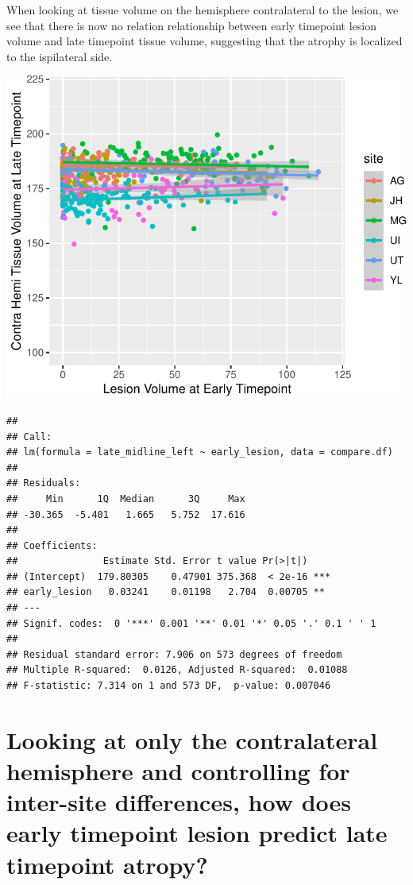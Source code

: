 \documentclass[
]{article}
\begin{document}
When looking at tissue volume on the hemisphere contralateral to the
lesion, we see that there is now no relation relationship between early
timepoint lesion volume and late timepoint tissue volume, suggesting
that the atrophy is localized to the ispilateral side.

\begin{center}\includegraphics{paper_files/figure-latex/plot_raw_contra-1} \end{center}

\begin{verbatim}
## 
## Call:
## lm(formula = late_midline_left ~ early_lesion, data = compare.df)
## 
## Residuals:
##     Min      1Q  Median      3Q     Max 
## -30.365  -5.401   1.665   5.752  17.616 
## 
## Coefficients:
##               Estimate Std. Error t value Pr(>|t|)    
## (Intercept)  179.80305    0.47901 375.368  < 2e-16 ***
## early_lesion   0.03241    0.01198   2.704  0.00705 ** 
## ---
## Signif. codes:  0 '***' 0.001 '**' 0.01 '*' 0.05 '.' 0.1 ' ' 1
## 
## Residual standard error: 7.906 on 573 degrees of freedom
## Multiple R-squared:  0.0126, Adjusted R-squared:  0.01088 
## F-statistic: 7.314 on 1 and 573 DF,  p-value: 0.007046
\end{verbatim}

\hypertarget{looking-at-only-the-contralateral-hemisphere-and-controlling-for-inter-site-differences-how-does-early-timepoint-lesion-predict-late-timepoint-atropy}{%
\section{Looking at only the contralateral hemisphere and controlling
for inter-site differences, how does early timepoint lesion predict late
timepoint
atropy?}\label{looking-at-only-the-contralateral-hemisphere-and-controlling-for-inter-site-differences-how-does-early-timepoint-lesion-predict-late-timepoint-atropy}}
\end{document}
